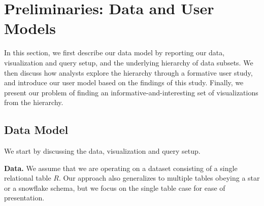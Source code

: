 \section{Preliminaries: Data and User Models} 

In this section, we first describe our data model by reporting our data, visualization and query setup, and the underlying hierarchy of data subsets. We then discuss how analysts explore the hierarchy through a formative user study, and introduce our user model based on the findings of this study. Finally, we present our problem of finding an informative-and-interesting set of visualizations from the hierarchy.


\subsection{Data Model}
We start by discussing the data, visualization and query setup.

\textbf{Data.} We assume that we are operating on a dataset consisting of a single relational table $R$. Our approach also generalizes to multiple tables obeying a star or a snowflake schema, but we focus on the single table case for ease of presentation.


